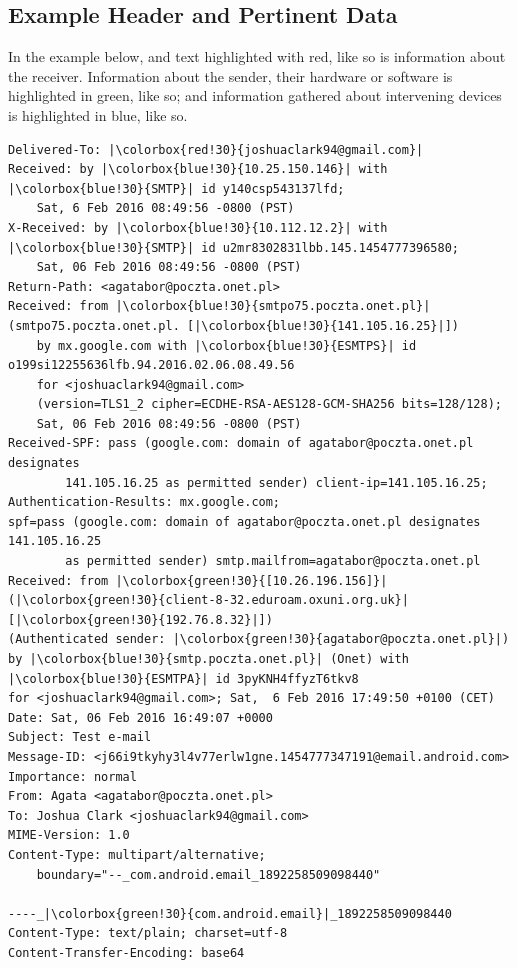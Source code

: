 \subsection{Example Header and Pertinent Data}

In the example below, and text highlighted with red, \colorbox{red!30}{like so}
is information about the receiver.  Information about the sender, their
hardware or software is highlighted in green, \colorbox{green!30}{like so}; and
information gathered about intervening devices is highlighted in blue,
\colorbox{blue!30}{like so}.

\begin{lstlisting}
Delivered-To: |\colorbox{red!30}{joshuaclark94@gmail.com}|
Received: by |\colorbox{blue!30}{10.25.150.146}| with |\colorbox{blue!30}{SMTP}| id y140csp543137lfd;
	Sat, 6 Feb 2016 08:49:56 -0800 (PST)
X-Received: by |\colorbox{blue!30}{10.112.12.2}| with |\colorbox{blue!30}{SMTP}| id u2mr8302831lbb.145.1454777396580;
	Sat, 06 Feb 2016 08:49:56 -0800 (PST)
Return-Path: <agatabor@poczta.onet.pl>
Received: from |\colorbox{blue!30}{smtpo75.poczta.onet.pl}| (smtpo75.poczta.onet.pl. [|\colorbox{blue!30}{141.105.16.25}|])
	by mx.google.com with |\colorbox{blue!30}{ESMTPS}| id o199si12255636lfb.94.2016.02.06.08.49.56
	for <joshuaclark94@gmail.com>
	(version=TLS1_2 cipher=ECDHE-RSA-AES128-GCM-SHA256 bits=128/128);
	Sat, 06 Feb 2016 08:49:56 -0800 (PST)
Received-SPF: pass (google.com: domain of agatabor@poczta.onet.pl designates
		141.105.16.25 as permitted sender) client-ip=141.105.16.25;
Authentication-Results: mx.google.com;
spf=pass (google.com: domain of agatabor@poczta.onet.pl designates 141.105.16.25
		as permitted sender) smtp.mailfrom=agatabor@poczta.onet.pl
Received: from |\colorbox{green!30}{[10.26.196.156]}| (|\colorbox{green!30}{client-8-32.eduroam.oxuni.org.uk}| [|\colorbox{green!30}{192.76.8.32}|])
(Authenticated sender: |\colorbox{green!30}{agatabor@poczta.onet.pl}|)
by |\colorbox{blue!30}{smtp.poczta.onet.pl}| (Onet) with |\colorbox{blue!30}{ESMTPA}| id 3pyKNH4ffyzT6tkv8
for <joshuaclark94@gmail.com>; Sat,  6 Feb 2016 17:49:50 +0100 (CET)
Date: Sat, 06 Feb 2016 16:49:07 +0000
Subject: Test e-mail
Message-ID: <j66i9tkyhy3l4v77erlw1gne.1454777347191@email.android.com>
Importance: normal
From: Agata <agatabor@poczta.onet.pl>
To: Joshua Clark <joshuaclark94@gmail.com>
MIME-Version: 1.0
Content-Type: multipart/alternative;
	boundary="--_com.android.email_1892258509098440"

----_|\colorbox{green!30}{com.android.email}|_1892258509098440
Content-Type: text/plain; charset=utf-8
Content-Transfer-Encoding: base64


\end{lstlisting}
